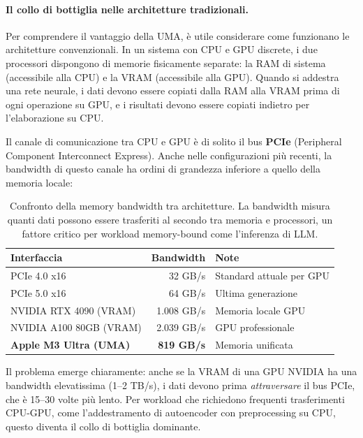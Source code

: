 \paragraph{Il collo di bottiglia nelle architetture tradizionali.}
Per comprendere il vantaggio della UMA, è utile considerare come funzionano le architetture convenzionali. In un sistema con CPU e GPU discrete, i due processori dispongono di memorie fisicamente separate: la RAM di sistema (accessibile alla CPU) e la VRAM (accessibile alla GPU). Quando si addestra una rete neurale, i dati devono essere copiati dalla RAM alla VRAM prima di ogni operazione su GPU, e i risultati devono essere copiati indietro per l'elaborazione su CPU.

Il canale di comunicazione tra CPU e GPU è 
di solito %
il bus \textbf{PCIe} (Peripheral Component Interconnect Express). Anche nelle configurazioni più recenti, 
la %
bandwidth di questo canale 
ha %
ordini di grandezza inferiore a quello della memoria locale:

\begin{table}[htbp]
    \centering
    \caption{Confronto della memory bandwidth tra architetture. La bandwidth misura quanti dati possono essere trasferiti al secondo tra memoria e processori, un fattore critico per workload memory-bound come l'inferenza di LLM.}
    \label{tab:bandwidth_comparison}
    \begin{tabular}{@{}lrl@{}}
        \toprule
        \textbf{Interfaccia} & \textbf{Bandwidth} & \textbf{Note} \\
        \midrule
        PCIe 4.0 x16 & 32 GB/s & Standard attuale per GPU \\
        PCIe 5.0 x16 & 64 GB/s & Ultima generazione \\
        \midrule
        NVIDIA RTX 4090 (VRAM) & 1.008 GB/s & Memoria locale GPU \\
        NVIDIA A100 80GB (VRAM) & 2.039 GB/s & GPU professionale \\
        \midrule
        \textbf{Apple M3 Ultra (UMA)} & \textbf{819 GB/s} & Memoria unificata \\
        \bottomrule
    \end{tabular}
\end{table}

Il problema emerge chiaramente: anche se la VRAM di una GPU NVIDIA ha una bandwidth elevatissima (1--2 TB/s), i dati devono prima \textit{attraversare} il bus PCIe, che è 15--30 volte più lento. Per workload che richiedono frequenti trasferimenti CPU-GPU, come l'addestramento di autoencoder con preprocessing su CPU, questo diventa il collo di bottiglia dominante.


